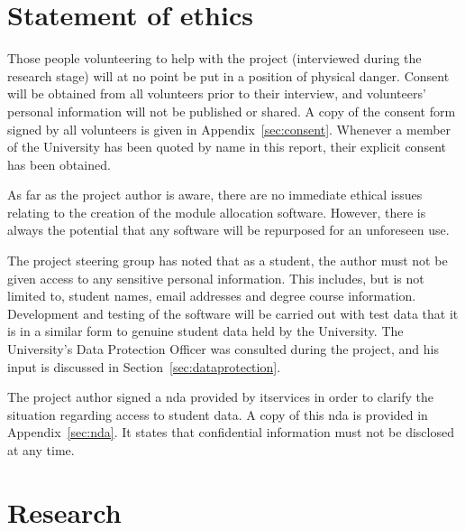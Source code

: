 \documentclass[twoside,draft]{scrartcl}
\let\stdsection\section
\renewcommand\section{\clearpage\stdsection}
\begin{document}
\clearpage
\tableofcontents

\clearpage
\listoffigures


\section{Statement of ethics}


Those people volunteering to help with the project (interviewed during the
research stage) will at no point be put in a position of physical danger.
Consent will be obtained from all volunteers prior to their interview, and
volunteers' personal information will not be published or shared. A copy of
the consent form signed by all volunteers is given in
Appendix~\ref{sec:consent}. Whenever a member of the University has been
quoted by name in this report, their explicit consent has been obtained.


As far as the project author is aware, there are no immediate ethical issues
relating to the creation of the module allocation software. However, there is
always the potential that any software will be repurposed for an unforeseen
use.


The project steering group has noted that as a student, the author must not be
given access to any sensitive personal information. This includes, but is not
limited to, student names, email addresses and degree course information.
Development and testing of the software will be carried out with test data
that it is in a similar form to genuine student data held by the University.
The University's Data Protection Officer was consulted during the project, and
his input is discussed in Section~\ref{sec:dataprotection}.

The project author signed a \gls{nda} provided by \gls{itservices} in order to
clarify the situation regarding access to student data. A copy of this
\gls{nda} is provided in Appendix~\ref{sec:nda}. It states that confidential
information must not be disclosed at any time.










\section{Research}
\label{sec:research}
\end{document}
